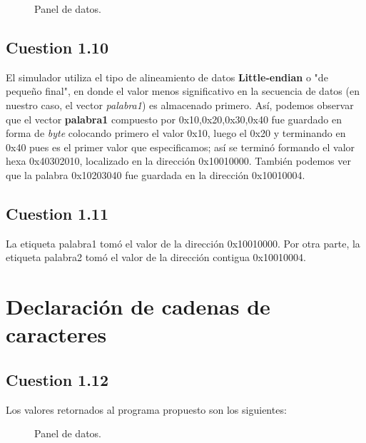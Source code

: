 \documentclass[11pt]{article}
\begin{document}
\begin{large}
\begin{flushleft}
\begin{figure}[H]
    \centering
    \caption{Panel de datos.}
    \label{fig:my_label}
\end{figure}


\subsection*{Cuestion 1.10}
El simulador utiliza el tipo de alineamiento de datos \textbf{Little-endian} o "de pequeño final", en donde el valor menos significativo en la secuencia de datos (en nuestro caso, el vector \textit{palabra1}) es almacenado primero. Así, podemos observar que el vector \textbf{palabra1} compuesto por 0x10,0x20,0x30,0x40 fue guardado en forma de \textit{byte} colocando primero el valor 0x10, luego el 0x20 y terminando en 0x40 pues es el primer valor que especificamos; así se terminó formando el valor hexa 0x40302010, localizado en la dirección 0x10010000. También podemos ver que la palabra 0x10203040 fue guardada en la dirección 0x10010004.



\subsection*{Cuestion 1.11}
La etiqueta palabra1 tomó el valor de la dirección 0x10010000. Por otra parte, la etiqueta palabra2 tomó el valor de la dirección contigua 0x10010004.

\section*{Declaración de cadenas de caracteres}

\subsection*{Cuestion 1.12}
Los valores retornados al programa propuesto son los siguientes:

\begin{figure}[H]
    \centering
    \caption{Panel de datos.}
    \label{fig:my_label}
\end{figure}


\end{flushleft}
\end{large}
\end{document}
